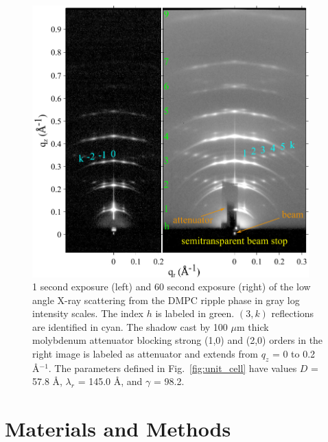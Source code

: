 \begin{figure}[htbp]
  \centering
  \includegraphics[width=0.95\textwidth]{figures/ripple/ripple083and085}
  \caption{1 second exposure (left) and 60 second exposure (right) of the low
  angle X-ray scattering from the DMPC ripple phase in gray log intensity scales. 
  The index $h$ is 
  labeled in green. $(3,k)$ reflections are identified in cyan. 
  The shadow cast by 100 $\mu$m thick molybdenum attenuator blocking
  strong (1,0) and (2,0) orders in the right image is labeled as attenuator
  and extends from $q_z$ = 0 to 0.2 \AA$^{-1}$.
  The parameters defined in Fig.~\ref{fig:unit_cell} have values
  $D$ = 57.8 \AA, $\lambda_r$ = 145.0 \AA, and $\gamma$ = 98.2\textdegree.}
  \label{fig:ripple_laxs_images}  
\end{figure} 


\newpage
\section{Materials and Methods}\label{sec:ripple_MMs}
